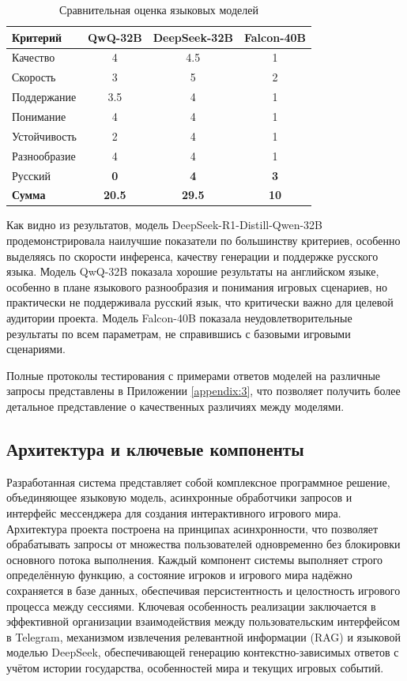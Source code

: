 \begin{table}[h]
\centering
\caption{Сравнительная оценка языковых моделей}
\label{tab:compare_models}
\begin{tabular}{|l|c|c|c|}
\hline
\textbf{Критерий} & \textbf{QwQ-32B} & \textbf{DeepSeek-32B} & \textbf{Falcon-40B} \\
\hline
Качество & 4 & 4.5 & 1 \\
\hline
Скорость & 3 & 5 & 2 \\
\hline
Поддержание & 3.5 & 4 & 1 \\
\hline
Понимание & 4 & 4 & 1 \\
\hline
Устойчивость & 2 & 4 & 1 \\
\hline
Разнообразие & 4 & 4 & 1 \\
\hline
Русский & \textbf{0} & \textbf{4} & \textbf{3} \\
\hline
\textbf{Сумма} & \textbf{20.5} & \textbf{29.5} & \textbf{10} \\
\hline
\end{tabular}
\end{table}


Как видно из результатов, модель DeepSeek-R1-Distill-Qwen-32B продемонстрировала наилучшие показатели по большинству критериев, особенно выделяясь по скорости инференса, качеству генерации и поддержке русского языка. Модель QwQ-32B показала хорошие результаты на английском языке, особенно в плане языкового разнообразия и понимания игровых сценариев, но практически не поддерживала русский язык, что критически важно для целевой аудитории проекта. Модель Falcon-40B показала неудовлетворительные результаты по всем параметрам, не справившись с базовыми игровыми сценариями.

Полные протоколы тестирования с примерами ответов моделей на различные запросы представлены в Приложении \ref{appendix:3}, что позволяет получить более детальное представление о качественных различиях между моделями.

\subsection{Архитектура и ключевые компоненты}
Разработанная система представляет собой комплексное программное решение, объединяющее языковую модель, асинхронные обработчики запросов и интерфейс мессенджера для создания интерактивного игрового мира. Архитектура проекта построена на принципах асинхронности, что позволяет обрабатывать запросы от множества пользователей одновременно без блокировки основного потока выполнения. Каждый компонент системы выполняет строго определённую функцию, а состояние игроков и игрового мира надёжно сохраняется в базе данных, обеспечивая персистентность и целостность игрового процесса между сессиями. Ключевая особенность реализации заключается в эффективной организации взаимодействия между пользовательским интерфейсом в Telegram, механизмом извлечения релевантной информации (RAG) и языковой моделью DeepSeek, обеспечивающей генерацию контекстно-зависимых ответов с учётом истории государства, особенностей мира и текущих игровых событий.
